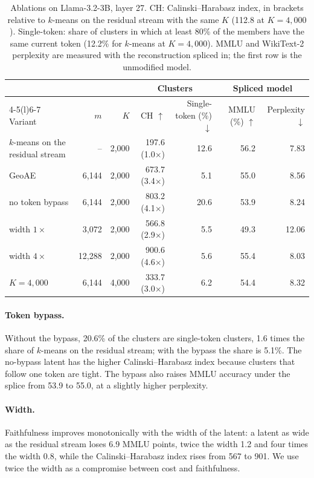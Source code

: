 \documentclass[11pt]{article}
\begin{document}
\begin{table}[t]
\centering
\small
\begin{tabular}{@{}l rr rr rr@{}}
\toprule
 & & & \multicolumn{2}{c}{Clusters} & \multicolumn{2}{c}{Spliced model} \\
\cmidrule(lr){4-5}\cmidrule(l){6-7}
Variant & $m$ & $K$ & CH $\uparrow$ & Single-token (\%) $\downarrow$ & MMLU (\%) $\uparrow$ & Perplexity $\downarrow$ \\
\midrule
$k$-means on the residual stream & -- & 2{,}000 & 197.6 (1.0$\times$) & 12.6 & 56.2 & 7.83 \\
\addlinespace[2pt]
GeoAE & 6{,}144 & 2{,}000 & 673.7 (3.4$\times$) & 5.1 & 55.0 & 8.56 \\
\quad no token bypass & 6{,}144 & 2{,}000 & 803.2 (4.1$\times$) & 20.6 & 53.9 & 8.24 \\
\quad width $1\times$ & 3{,}072 & 2{,}000 & 566.8 (2.9$\times$) & 5.5 & 49.3 & 12.06 \\
\quad width $4\times$ & 12{,}288 & 2{,}000 & 900.6 (4.6$\times$) & 5.6 & 55.4 & 8.03 \\
\quad $K = 4{,}000$ & 6{,}144 & 4{,}000 & 333.7 (3.0$\times$) & 6.2 & 54.4 & 8.32 \\
\bottomrule
\end{tabular}
\caption{Ablations on Llama-3.2-3B, layer 27. CH: Calinski--Harabasz index, in brackets relative to $k$-means on the residual stream with the same $K$ (112.8 at $K = 4{,}000$). Single-token: share of clusters in which at least 80\% of the members have the same current token (12.2\% for $k$-means at $K = 4{,}000$). MMLU and WikiText-2 perplexity are measured with the reconstruction spliced in; the first row is the unmodified model.}
\label{tab:ablation}
\end{table}

\paragraph{Token bypass.}
Without the bypass, 20.6\% of the clusters are single-token clusters, 1.6 times the share of $k$-means on the residual stream; with the bypass the share is 5.1\%.
The no-bypass latent has the higher Calinski--Harabasz index because clusters that follow one token are tight.
The bypass also raises MMLU accuracy under the splice from 53.9 to 55.0, at a slightly higher perplexity.

\paragraph{Width.}
Faithfulness improves monotonically with the width of the latent: a latent as wide as the residual stream loses 6.9 MMLU points, twice the width 1.2 and four times the width 0.8, while the Calinski--Harabasz index rises from 567 to 901.
We use twice the width as a compromise between cost and faithfulness.
\end{document}
